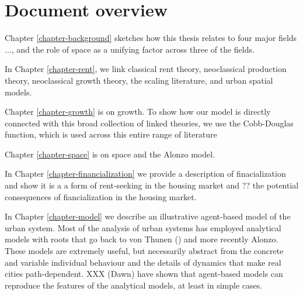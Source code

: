 \section{Document overview}

Chapter \ref{chapter-background} sketches how this thesis relates to four major fields ..., and the role of space as a unifying factor across three of the fields.

In Chapter \ref{chapter-rent}, we link classical rent theory, neoclassical production theory, neoclassical growth theory, the scaling literature, and urban spatial models.

Chapter \ref{chapter-growth} is on growth. To show how our model is directly connected with this broad collection of linked theories, we use the Cobb-Douglas function, which is used across this entire range of literature 



Chapter \ref{chapter-space} is on space and the Alonzo model.

In Chapter \ref{chapter-financialization} we  provide a description of finacialization and show it is a a form of rent-seeking in the housing market and ?? the potential consequences of fiancialization in the housing market. 

In Chapter \ref{chapter-model} we  describe an illustrative agent-based model of the urban system. Most of the analysis of urban systems has employed analytical models with roots that go back to von Thunen () and more recently Alonzo. These models are extremely useful, but necessarily abstract from the concrete  and variable individual behaviour and  the details  of dynamics that make real cities path-dependent. XXX (Dawn) have shown that agent-based models can reproduce the features of the analytical models, at least in simple cases. 



